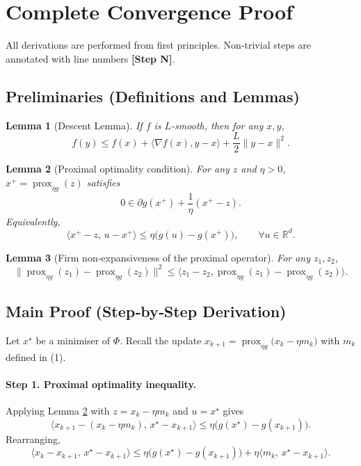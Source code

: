 \documentclass{article}
\newtheorem{lemma}{Lemma}
\newcommand{\prox}{\operatorname{prox}}
\begin{document}
\section*{Complete Convergence Proof}
All derivations are performed from first principles. Non‑trivial steps are annotated with line numbers \textbf{[Step N]}.

\subsection*{Preliminaries (Definitions and Lemmas)}
\begin{lemma}[Descent Lemma]\label{lem:descent}
If $f$ is $L$‑smooth, then for any $x,y$,
\[
f(y)\le f(x)+\langle\nabla f(x),y-x\rangle+\frac{L}{2}\|y-x\|^{2}.
\tag{L1}
\]
\end{lemma}
\begin{lemma}[Proximal optimality condition]\label{lem:prox}
For any $z$ and $\eta>0$, $x^{+}= \prox_{\eta g}(z)$ satisfies
\[
0\in \partial g(x^{+})+\frac{1}{\eta}(x^{+}-z).
\tag{L2}
\]
Equivalently,
\[
\langle x^{+}-z,\,u-x^{+}\rangle\le \eta\bigl(g(u)-g(x^{+})\bigr),\qquad\forall u\in\mathbb{R}^{d}.
\tag{L3}
\]
\end{lemma}
\begin{lemma}[Firm non‑expansiveness of the proximal operator]\label{lem:firm}
For any $z_{1},z_{2}$,
\[
\|\prox_{\eta g}(z_{1})-\prox_{\eta g}(z_{2})\|^{2}
\le \langle z_{1}-z_{2},\prox_{\eta g}(z_{1})-\prox_{\eta g}(z_{2})\rangle.
\tag{L4}
\]
\end{lemma}

\subsection*{Main Proof (Step‑by‑Step Derivation)}
Let $x^{\star}$ be a minimiser of $\Phi$.  
Recall the update $x_{k+1}= \prox_{\eta g}\!\bigl(x_{k}-\eta m_{k}\bigr)$ with $m_{k}$ defined in (1).

\paragraph{Step 1. Proximal optimality inequality.}
Applying Lemma \ref{lem:prox} with $z=x_{k}-\eta m_{k}$ and $u=x^{\star}$ gives
\[
\langle x_{k+1}-(x_{k}-\eta m_{k}),\,x^{\star}-x_{k+1}\rangle
\le \eta\bigl(g(x^{\star})-g(x_{k+1})\bigr).
\tag{4}
\]
Rearranging,
\[
\langle x_{k}-x_{k+1},\,x^{\star}-x_{k+1}\rangle
\le \eta\bigl(g(x^{\star})-g(x_{k+1})\bigr)+\eta\langle m_{k},\,x^{\star}-x_{k+1}\rangle .
\tag{5}
\]
\end{document}
